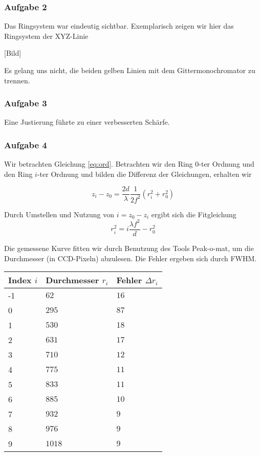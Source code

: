 \documentclass[a4paper,german,12pt,smallheadings]{scrartcl}
\begin{document}
\subsubsection{Aufgabe 2}

Das Ringsystem war eindeutig sichtbar. Exemplarisch zeigen wir hier das Ringsystem der XYZ-Linie

[Bild]

Es gelang uns nicht, die beiden gelben Linien mit dem Gittermonochromator zu
trennen.

\subsubsection{Aufgabe 3}

Eine Justierung führte zu einer verbesserten Schärfe.

\subsubsection{Aufgabe 4}

Wir betrachten Gleichung \ref{eq:ord}. Betrachten wir den Ring $0$-ter Ordnung
und den Ring $i$-ter Ordnung und bilden die Differenz der Gleichungen, erhalten
wir

\begin{equation}
  z_i - z_0 = \frac{2d}{\lambda} \frac{1}{2f^2} (r_i^2 + r_0^2)
\end{equation}

Durch Umstellen und Nutzung von $i = z_0 - z_i$ ergibt sich die Fitgleichung
\begin{equation}
  r_i^2 = i \frac{\lambda f^2}{d} - r_0^2
\end{equation}

Die gemessene Kurve fitten wir durch Benutzung des Tools Peak-o-mat, um die
Durchmesser (in CCD-Pixeln) abzulesen. Die Fehler ergeben sich durch FWHM.

\begin{tabular}{l|l|l}
  Index $i$ & Durchmesser $r_i$  & Fehler $\Delta r_i$ \\
  \hline
  -1 & $62$ & $16$ \\
  0 & $295$ & $87$ \\
  1 & $530$ & $18$ \\
  2 & $631$ & $17$ \\
  3 & $710$ & $12$ \\
  4 & $775$ & $11$ \\
  5 & $833$ & $11$ \\
  6 & $885$ & $10$ \\
  7 & $932$ & $9$  \\
  8 & $976$ & $9$  \\
  9 & $1018$ & $9$ \\
\end{tabular}
\end{document}
